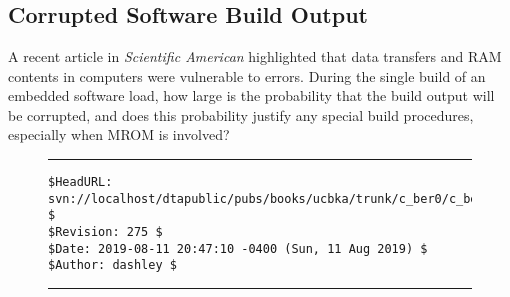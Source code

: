 
\chapter{\cberzerolongtitle{}}

\label{cber0}

\section{Corrupted Software Build Output}

A recent article in \emph{Scientific American}
highlighted that data transfers and RAM contents in computers
were vulnerable to errors.  During the single build of
an embedded software load, how large is the probability
that the build output will be corrupted, and does this
probability justify any special build procedures, especially when
MROM is involved?



\noindent\begin{figure}[!b]
\noindent\rule[-0.25in]{\textwidth}{1pt}
\begin{tiny}
\begin{verbatim}
$HeadURL: svn://localhost/dtapublic/pubs/books/ucbka/trunk/c_ber0/c_ber0.tex $
$Revision: 275 $
$Date: 2019-08-11 20:47:10 -0400 (Sun, 11 Aug 2019) $
$Author: dashley $
\end{verbatim}
\end{tiny}
\noindent\rule[0.25in]{\textwidth}{1pt}
\end{figure}

%
